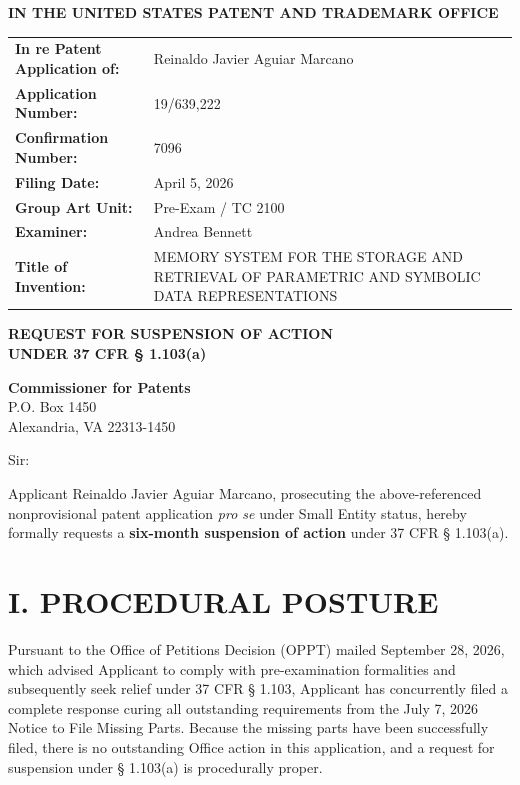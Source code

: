 \documentclass[11pt,letterpaper]{article}
\begin{document}
\thispagestyle{empty}

\begin{center}
    \large\textbf{IN THE UNITED STATES PATENT AND TRADEMARK OFFICE} \\
\end{center}

\vspace{0.3cm}
\noindent\begin{tabular}{p{2.3in}p{4.0in}}
\textbf{In re Patent Application of:} & Reinaldo Javier Aguiar Marcano \\
\textbf{Application Number:} & 19/639,222 \\
\textbf{Confirmation Number:} & 7096 \\
\textbf{Filing Date:} & April 5, 2026 \\
\textbf{Group Art Unit:} & Pre-Exam / TC 2100 \\
\textbf{Examiner:} & Andrea Bennett \\
\textbf{Title of Invention:} & MEMORY SYSTEM FOR THE STORAGE AND RETRIEVAL OF PARAMETRIC AND SYMBOLIC DATA REPRESENTATIONS \\
\end{tabular}

\vspace{0.8cm}
\begin{center}
    \textbf{\large REQUEST FOR SUSPENSION OF ACTION \\
    UNDER 37 CFR \S{} 1.103(a)}
\end{center}

\vspace{0.4cm}
\noindent\textbf{Commissioner for Patents} \\
\noindent P.O. Box 1450 \\
\noindent Alexandria, VA 22313-1450

\vspace{0.4cm}
\noindent Sir:

Applicant Reinaldo Javier Aguiar Marcano, prosecuting the above-referenced nonprovisional patent application \textit{pro se} under Small Entity status, hereby formally requests a \textbf{six-month suspension of action} under 37 CFR \S{} 1.103(a).

\section*{I. PROCEDURAL POSTURE}

Pursuant to the Office of Petitions Decision (OPPT) mailed September 28, 2026, which advised Applicant to comply with pre-examination formalities and subsequently seek relief under 37 CFR \S{} 1.103, Applicant has concurrently filed a complete response curing all outstanding requirements from the July 7, 2026 Notice to File Missing Parts. Because the missing parts have been successfully filed, there is no outstanding Office action in this application, and a request for suspension under \S{} 1.103(a) is procedurally proper.
\end{document}
